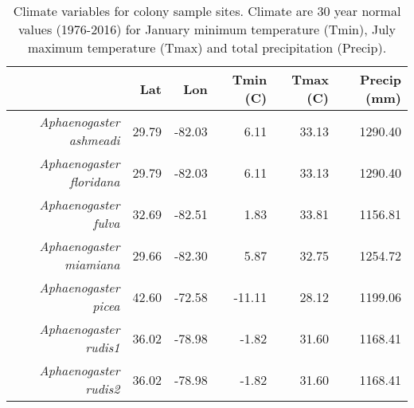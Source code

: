 \begin{table}[ht]
\centering
\begin{tabular}{rrrrrr}
  \hline
 & Lat & Lon & Tmin (C) & Tmax (C) & Precip (mm) \\ 
  \hline
{\emph{Aphaenogaster ashmeadi}} & 29.79 & -82.03 & 6.11 & 33.13 & 1290.40 \\ 
  {\emph{Aphaenogaster floridana}} & 29.79 & -82.03 & 6.11 & 33.13 & 1290.40 \\ 
  {\emph{Aphaenogaster fulva}} & 32.69 & -82.51 & 1.83 & 33.81 & 1156.81 \\ 
  {\emph{Aphaenogaster miamiana}} & 29.66 & -82.30 & 5.87 & 32.75 & 1254.72 \\ 
  {\emph{Aphaenogaster picea}} & 42.60 & -72.58 & -11.11 & 28.12 & 1199.06 \\ 
  {\emph{Aphaenogaster rudis1}} & 36.02 & -78.98 & -1.82 & 31.60 & 1168.41 \\ 
  {\emph{Aphaenogaster rudis2}} & 36.02 & -78.98 & -1.82 & 31.60 & 1168.41 \\ 
   \hline
\end{tabular}
\caption{Climate variables for colony sample sites. Climate are 30 year normal values (1976-2016) for January minimum temperature (Tmin), July maximum temperature (Tmax) and total precipitation (Precip).} 
\end{table}
